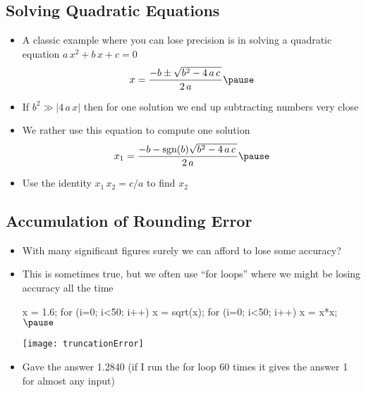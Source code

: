 \begin{slide}
\section[-1]{Solving Quadratic Equations}

\begin{PauseHighLight}
  \begin{itemize}
  \item A classic example where you can lose precision is in solving a
    quadratic equation \mbox{$a\,x^2 + b\,x + c =0$}
    \begin{align*}
      x = \frac{-b \pm \sqrt{b^2 - 4\,a\,c\,}}{2\,a}\pause
    \end{align*}
  \item If $b^2 \gg |4\,a\,x|$ then for one solution we end up
    subtracting numbers very close\pause
  \item We rather use this equation to compute one solution
    \begin{align*}
      x_1 = \frac{-b - \mathrm{sgn}(b) \sqrt{b^2 - 4\,a\,c\,}}{2\,a}\pause
    \end{align*}
  \item Use the identity $x_1\,x_2 = c/a$ to find $x_2$\pause
  \end{itemize}
\end{PauseHighLight}

\end{slide}



\begin{slide}
\section[-1]{Accumulation of Rounding Error}

\begin{PauseHighLight}
  \begin{itemize}
  \item With many significant figures surely we can afford to lose some
    accuracy?\pause
  \item This is sometimes true, but we often use ``for loops'' where we
    might be losing accuracy all the time
    \begin{minipage}{0.5\linewidth}
    \begin{java}
      x = 1.6;
      for (i=0; i<50; i++)
         x = sqrt(x);
      for (i=0; i<50; i++)
         x = x*x;$\pause$
    \end{java}      
    \end{minipage}\hfill
    \begin{minipage}{0.15\linewidth}
      \texttt{[image: truncationError]}\pauseb
    \end{minipage}
    \item Gave the answer 1.2840 (if I run the for loop 60 times it
      gives the answer 1 for almost any input)\pause
  \end{itemize}
\end{PauseHighLight}

\end{slide}



